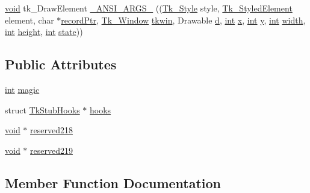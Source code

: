 \begin{DoxyCompactItemize}
\hyperlink{tk_8h_aba408b7cd755a96426e004c015f5de8e}{void} tk\+\_\+\+Draw\+Element \hyperlink{struct_tk_stubs_a56024c4607b1ba53f8cde8007e551b77}{\+\_\+\+A\+N\+S\+I\+\_\+\+A\+R\+G\+S\+\_\+} ((\hyperlink{tk_8h_aa71c7ce9e7b5bd71b0a8afd9fdb6e860}{Tk\+\_\+\+Style} style, \hyperlink{tk_8h_a9ad9f56129bda39e45e496bc690e4fc5}{Tk\+\_\+\+Styled\+Element} element, char $\ast$\hyperlink{tk_8h_ac9ba2e58d9bf54ae4b21855053aa52da}{record\+Ptr}, \hyperlink{tk_8h_ab756137de3ee74edc2501bd0d761e37c}{Tk\+\_\+\+Window} \hyperlink{tk_8h_a35df722e7e1b6efd651683b8be7c1490}{tkwin}, Drawable \hyperlink{tk_8h_a22f9147e8149ab2d2d9d221d52337f46}{d}, \hyperlink{tk_8h_a83f82f76e7fed06f4c49d2db94028a6d}{int} \hyperlink{tk_8h_a61ebd54d47cc56787649a3b8f126bda1}{x}, \hyperlink{tk_8h_a83f82f76e7fed06f4c49d2db94028a6d}{int} \hyperlink{tk_8h_a40f4f3601c0eaa8ca46b1a164264696d}{y}, \hyperlink{tk_8h_a83f82f76e7fed06f4c49d2db94028a6d}{int} \hyperlink{tk_8h_a29e50a5401c1396b3a2aa3487f74d468}{width}, \hyperlink{tk_8h_a83f82f76e7fed06f4c49d2db94028a6d}{int} \hyperlink{tk_8h_a67be2f4b9d9c5b3559139bfb072e2e81}{height}, \hyperlink{tk_8h_a83f82f76e7fed06f4c49d2db94028a6d}{int} \hyperlink{tk_8h_a918d008222fe1f52f05e6129115c30eb}{state}))
\end{DoxyCompactItemize}
\subsection*{Public Attributes}
\begin{DoxyCompactItemize}
\item 
\hyperlink{tk_8h_a83f82f76e7fed06f4c49d2db94028a6d}{int} \hyperlink{struct_tk_stubs_a562f2a3f8399590ac2757edecb5bd084}{magic}
\item 
struct \hyperlink{struct_tk_stub_hooks}{Tk\+Stub\+Hooks} $\ast$ \hyperlink{struct_tk_stubs_aa9c2bd375d5928465a59d2269d58edcf}{hooks}
\item 
\hyperlink{tk_8h_aba408b7cd755a96426e004c015f5de8e}{void} $\ast$ \hyperlink{struct_tk_stubs_aaaa64061caa69206db19c2a818ab2de6}{reserved218}
\item 
\hyperlink{tk_8h_aba408b7cd755a96426e004c015f5de8e}{void} $\ast$ \hyperlink{struct_tk_stubs_aa20e10a582c6fe434d88073d5a21c7c9}{reserved219}
\end{DoxyCompactItemize}


\subsection{Member Function Documentation}
